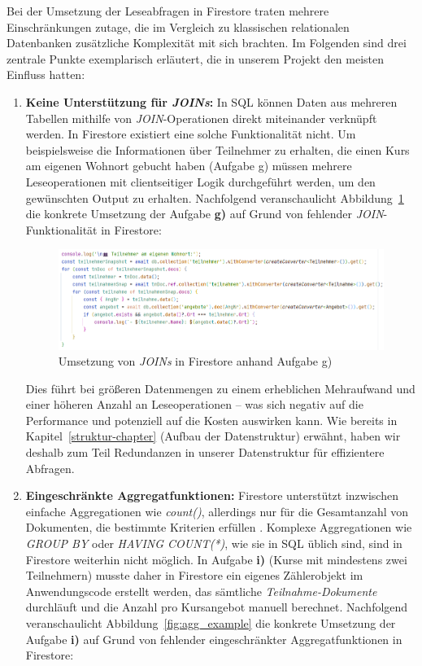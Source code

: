 \documentclass[12pt,a4paper%
              ,oneside     %
              ,titlepage
              ,DIV=13
              ,headinclude
              ,footinclude=false%
              ,cleardoublepage=empty%
              ,parskip=half,
              BCOR=0mm,
              ]{scrreprt}
\begin{document}
Bei der Umsetzung der Leseabfragen in Firestore traten mehrere Einschränkungen zutage, die im Vergleich zu klassischen relationalen Datenbanken zusätzliche Komplexität mit sich brachten. Im Folgenden sind drei zentrale Punkte exemplarisch erläutert, die in unserem Projekt den meisten Einfluss hatten:

\begin{enumerate}
	\item \textbf{Keine Unterstützung für \textit{JOINs}:} 
	In SQL können Daten aus mehreren Tabellen mithilfe von \textit{JOIN}-Operationen direkt miteinander verknüpft werden. In Firestore existiert eine solche Funktionalität nicht. Um beispielsweise die Informationen über Teilnehmer zu erhalten, die einen Kurs am eigenen Wohnort gebucht haben (Aufgabe g) müssen mehrere Leseoperationen mit clientseitiger Logik durchgeführt werden, um den gewünschten Output zu erhalten. Nachfolgend veranschaulicht Abbildung~\ref{fig:join_example} die konkrete Umsetzung der Aufgabe \textbf{g)} auf Grund von fehlender \textit{JOIN}-Funktionalität in Firestore:
	
	\begin{figure}[H]
		\centering
		\includegraphics[width=\dimexpr0.9\linewidth]{img/g_join_example.png}
		\caption{Umsetzung von \textit{JOINs} in Firestore anhand Aufgabe g)}
		\label{fig:join_example}
	\end{figure}
	
	Dies führt bei größeren Datenmengen zu einem erheblichen Mehraufwand und einer höheren Anzahl an Leseoperationen – was sich negativ auf die Performance und potenziell auf die Kosten auswirken kann. Wie bereits in Kapitel~\ref{struktur-chapter} (\glqq Aufbau der Datenstruktur\grqq{}) erwähnt, haben wir deshalb zum Teil Redundanzen in unserer Datenstruktur für effizientere Abfragen.\newline
	
	\item \textbf{Eingeschränkte Aggregatfunktionen:}
    Firestore unterstützt inzwischen einfache Aggregationen wie \textit{count()}, allerdings nur für die Gesamtanzahl von Dokumenten, die bestimmte Kriterien erfüllen \cite{FirebaseCount.2025}. Komplexe Aggregationen wie \textit{GROUP BY} oder \textit{HAVING COUNT(*)}, wie sie in SQL üblich sind, sind in Firestore weiterhin nicht möglich. In Aufgabe \textbf{i)} (Kurse mit mindestens zwei Teilnehmern) musste daher in Firestore ein eigenes Zählerobjekt im Anwendungscode erstellt werden, das sämtliche \textit{Teilnahme-Dokumente} durchläuft und die Anzahl pro Kursangebot manuell berechnet. Nachfolgend veranschaulicht Abbildung~\ref{fig:agg_example} die konkrete Umsetzung der Aufgabe \textbf{i)} auf Grund von fehlender eingeschränkter Aggregatfunktionen in Firestore:
    

\end{enumerate}
\end{document}
